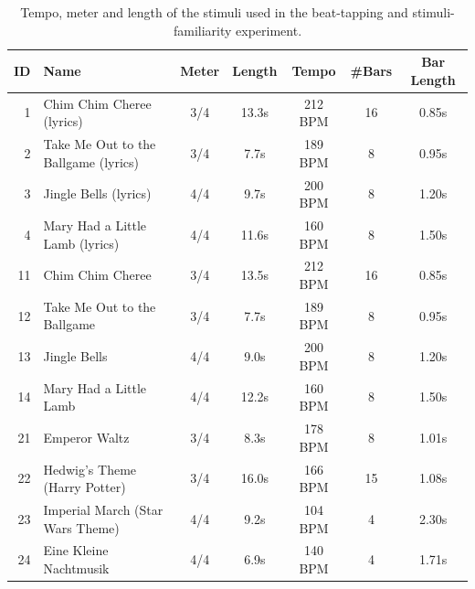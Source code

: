 \begin{table}[t]
\small
\centering
\caption{Tempo, meter and length of the stimuli used in the beat-tapping and stimuli-familiarity experiment.}
\label{tab:stimuli_information}
\begin{tabularx}{\columnwidth}{r l c c  c c c }
\toprule
ID		& Name							&Meter 	& Length	& Tempo 		&\#Bars	& Bar Length\\
\midrule
1		& Chim Chim Cheree (lyrics)			& 3/4		& 13.3s 			& 212 BPM 	& 16				& 0.85s	\\ 
2		& Take Me Out to the Ballgame (lyrics)	& 3/4		& 7.7s 			& 189 BPM 	& 8				& 0.95s	\\ 
3		& Jingle Bells (lyrics)					& 4/4		& 9.7s 			& 200 BPM 	& 8				& 1.20s	\\ 
4		& Mary Had a Little Lamb (lyrics)		& 4/4		& 11.6s			& 160 BPM 	& 8				& 1.50s	\\ 
11		& Chim Chim Cheree 				& 3/4		& 13.5s	 		& 212 BPM 	& 16				& 0.85s	\\ 
12		& Take Me Out to the Ballgame			& 3/4		& 7.7s 			& 189 BPM 	& 8				& 0.95s	\\ 
13		& Jingle Bells 						& 4/4		& 9.0s 			& 200 BPM 	& 8				& 1.20s	\\ 
14		& Mary Had a Little Lamb				& 4/4		& 12.2s			& 160 BPM 	& 8				& 1.50s	\\ 
21		& Emperor Waltz					& 3/4		& 8.3s 			& 178 BPM 	& 8				& 1.01s	\\ 
22		& Hedwig's Theme (Harry Potter)		& 3/4		& 16.0s	 		& 166 BPM 	& 15				& 1.08s	\\
23		& Imperial March (Star Wars Theme)		& 4/4		& 9.2s 			& 104 BPM 	& 4				& 2.30s	\\ 
24		& Eine Kleine Nachtmusik				& 4/4		& 6.9s			& 140 BPM 	& 4				& 1.71s	\\
\bottomrule
\end{tabularx}
\end{table}


